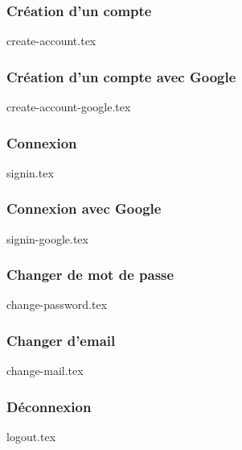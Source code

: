 \subsubsection{Création d'un compte}
{create-account.tex}


\subsubsection{Création d'un compte avec Google}
{create-account-google.tex}

\subsubsection{Connexion}
{signin.tex}

\subsubsection{Connexion avec Google}
{signin-google.tex}

\subsubsection{Changer de mot de passe}
{change-password.tex}

\subsubsection{Changer d'email}
{change-mail.tex}

\subsubsection{Déconnexion}
{logout.tex}